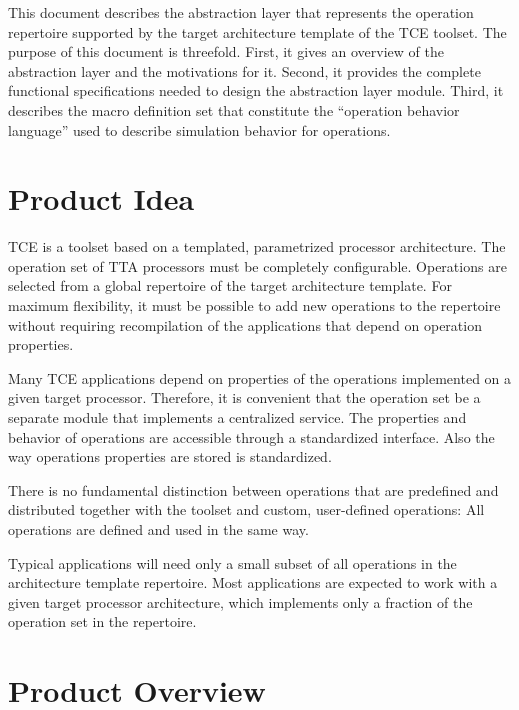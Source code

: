 \documentclass[twoside]{tce}
\begin{document}
This document describes the abstraction layer that represents the operation
repertoire supported by the target architecture template of the TCE toolset.
The purpose of this document is threefold.  First, it gives an overview of the
abstraction layer and the motivations for it.  Second, it provides the
complete functional specifications needed to design the abstraction layer
module. Third, it describes the macro definition set that constitute the
``operation behavior language'' used to describe simulation behavior for
operations.

\section{Product Idea}

TCE is a toolset based on a templated, parametrized processor architecture.
The operation set of TTA processors must be completely configurable.
Operations are selected from a global repertoire of the target architecture
template.  For maximum flexibility, it must be possible to add new
operations to the repertoire without requiring recompilation of the
applications that depend on operation properties.

Many TCE applications depend on properties of the operations implemented on
a given target processor.  Therefore, it is convenient that the operation
set be a separate module that implements a centralized service.  The
properties and behavior of operations are accessible through a standardized
interface.  Also the way operations properties are stored is standardized.

There is no fundamental distinction between operations that are predefined
and distributed together with the toolset and custom, user-defined
operations: All operations are defined and used in the same way.

Typical applications will need only a small subset of all operations in the
architecture template repertoire.  Most applications are expected to work
with a given target processor architecture, which implements only a fraction
of the operation set in the repertoire.

\section{Product Overview}
\end{document}
